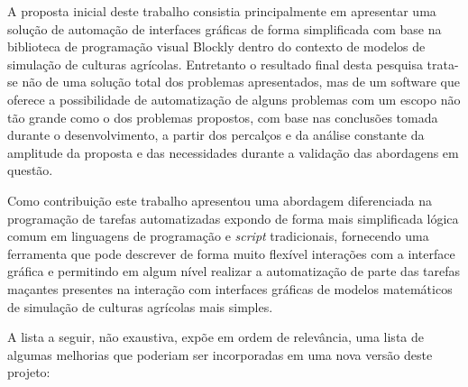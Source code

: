 \documentclass[tg]{mdtufsm}
\begin{document}
            A proposta inicial deste trabalho consistia principalmente em apresentar uma solução de automação de interfaces gráficas de forma simplificada com base na biblioteca de programação visual Blockly dentro do contexto de modelos de simulação de culturas agrícolas. Entretanto o resultado final desta pesquisa trata-se não de uma solução total dos problemas apresentados, mas de um software que oferece a possibilidade de automatização de alguns problemas com um escopo não tão grande como o dos problemas propostos, com base nas conclusões tomada durante o desenvolvimento, a partir dos percalços e da análise constante da amplitude da proposta e das necessidades durante a validação das abordagens em questão.

            Como contribuição este trabalho apresentou uma abordagem diferenciada na programação de tarefas automatizadas expondo de forma mais simplificada lógica comum em linguagens de programação e \emph{script} tradicionais, fornecendo uma ferramenta que pode descrever de forma muito flexível interações com a interface gráfica e permitindo em algum nível realizar a automatização de parte das tarefas maçantes presentes na interação com interfaces gráficas de modelos matemáticos de simulação de culturas agrícolas mais simples.

            A lista a seguir, não exaustiva, expõe em ordem de relevância, uma lista  de algumas melhorias que poderiam ser incorporadas em uma nova versão deste projeto:
\end{document}
